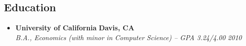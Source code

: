 \subsection*{Education}

\begin{itemize}
	\parskip=0.1em

	\item 
	\headerrow
		{\textbf{University of California}}
		{\textbf{Davis, CA}}
	\\
	\headerrow
		{\emph{B.A., Economics (with minor in Computer Science) -- GPA 3.24/4.00}}
		{\emph{2010}}

\end{itemize}
